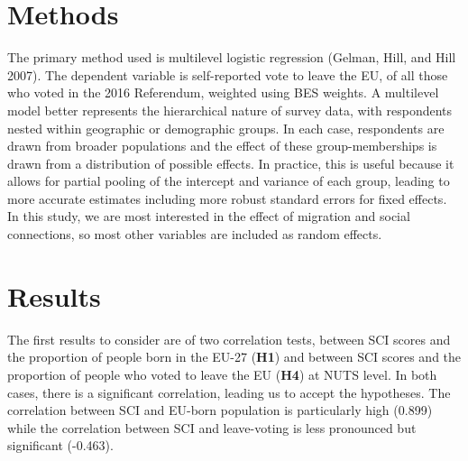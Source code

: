 \documentclass{article}
\begin{document}
\hypertarget{methods}{%
\section{Methods}\label{methods}}

The primary method used is multilevel logistic regression (Gelman, Hill,
and Hill 2007). The dependent variable is self-reported vote to leave
the EU, of all those who voted in the 2016 Referendum, weighted using
BES weights. A multilevel model better represents the hierarchical
nature of survey data, with respondents nested within geographic or
demographic groups. In each case, respondents are drawn from broader
populations and the effect of these group-memberships is drawn from a
distribution of possible effects. In practice, this is useful because it
allows for partial pooling of the intercept and variance of each group,
leading to more accurate estimates including more robust standard errors
for fixed effects. In this study, we are most interested in the effect
of migration and social connections, so most other variables are
included as random effects.

\hypertarget{results}{%
\section{Results}\label{results}}

The first results to consider are of two correlation tests, between SCI
scores and the proportion of people born in the EU-27 (\textbf{H1}) and
between SCI scores and the proportion of people who voted to leave the
EU (\textbf{H4}) at NUTS level. In both cases, there is a significant
correlation, leading us to accept the hypotheses. The correlation
between SCI and EU-born population is particularly high (0.899) while
the correlation between SCI and leave-voting is less pronounced but
significant (-0.463).
\end{document}
